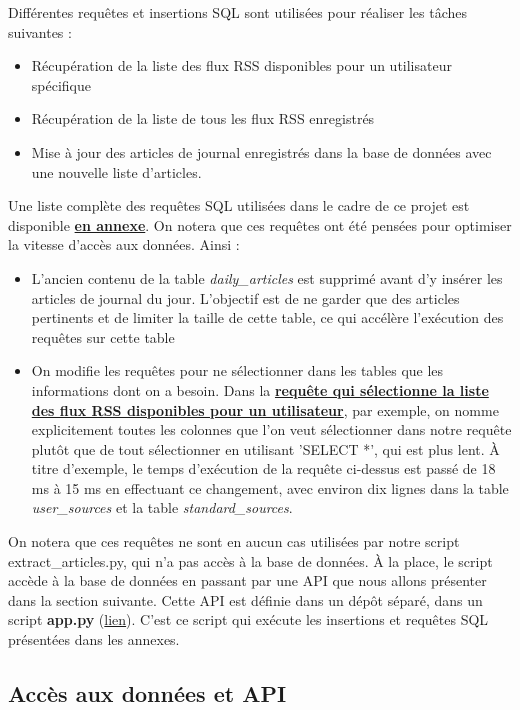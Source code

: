 \documentclass[french]{article}
\begin{document}
    Différentes requêtes et insertions SQL sont utilisées pour réaliser les tâches suivantes :
    \begin{itemize}
        \item Récupération de la liste des flux RSS disponibles pour un utilisateur spécifique
        \item Récupération de la liste de tous les flux RSS enregistrés
        \item Mise à jour des articles de journal enregistrés dans la base de données avec une nouvelle liste d'articles.
    \end{itemize} 
    Une liste complète des requêtes SQL utilisées dans le cadre de ce projet est disponible \textbf{\hyperref[sec:sql]{en annexe}}.
    On notera que ces requêtes ont été pensées pour optimiser la vitesse d'accès aux données. Ainsi :
    \begin{itemize}
        \item L'ancien contenu de la table \textit{daily\_articles} est supprimé avant d'y insérer les articles de journal du jour. L'objectif est de ne garder que des articles pertinents et de limiter la taille de cette table, ce qui accélère l'exécution des requêtes sur cette table
        \item On modifie les requêtes pour ne sélectionner dans les tables que les informations dont on a besoin. Dans la \textbf{\hyperref[sec:query]{requête qui sélectionne la liste des flux RSS disponibles pour un utilisateur}}, par exemple, on nomme explicitement toutes les colonnes que l'on veut sélectionner dans notre requête plutôt que de tout sélectionner en utilisant 'SELECT *', qui est plus lent. À titre d'exemple, le temps d'exécution de la requête ci-dessus est passé de 18 ms à 15 ms en effectuant ce changement, avec environ dix lignes dans la table \textit{user\_sources} et la table \textit{standard\_sources}.
    \end{itemize} 
    

    On notera que ces requêtes ne sont en aucun cas utilisées par notre script extract\_articles.py, qui n'a pas accès à la base de données. À la place, le script accède à la base de données en passant par une API que nous allons présenter dans la section suivante. Cette API est définie dans un dépôt séparé, dans un script \textbf{app.py} (\href{https://github.com/vinpap/your_news_anchor_db_api/blob/main/app.py}{lien}). C'est ce script qui exécute les insertions et requêtes SQL présentées dans les annexes.
    
    \subsection{Accès aux données et API}
    
\end{document}
